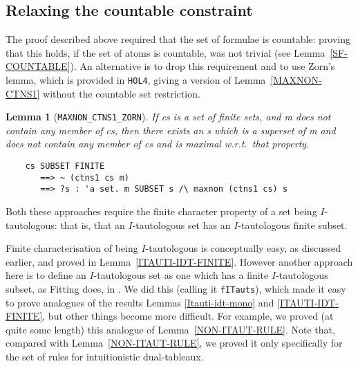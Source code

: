 \documentclass[a4paper]{article}
\newtheorem{lemma}{Lemma}
\newcommand{\hol}{\texttt{HOL4}}
\begin{document}
\subsection{Relaxing the countable constraint}

The proof described above required that the set of formulae is
countable: proving that this holds, if the set of atoms is countable,
was not trivial (see Lemma~\ref{SF-COUNTABLE}).
An alternative is to drop this requirement and to use Zorn's lemma, which is
provided in \hol, giving a version of Lemma~\ref{MAXNON-CTNS1}
without the countable set restriction.

\begin{lemma}[\texttt{MAXNON\_CTNS1\_ZORN}] \label{MAXNON-CTNS1-ZORN}
  If cs is a set of finite sets, and m does not contain any member of cs,
  then there exists an s which is a  superset of m 
  and does not contain any
  member of cs and is maximal w.r.t.\ that property.
\begin{verbatim}
    cs SUBSET FINITE 
       ==> ~ (ctns1 cs m) 
       ==> ?s : 'a set. m SUBSET s /\ maxnon (ctns1 cs) s
\end{verbatim}
\end{lemma}

Both these approaches require the finite character property of 
a set being $I$-tautologous: that is, that an $I$-tautologous set has
an $I$-tautologous finite subset.

Finite characterisation of being $I$-tautologous is conceptually easy,
as discussed earlier, and proved in Lemma~\ref{ITAUTI-IDT-FINITE}.
%
However another approach here is to define an $I$-tautologous set as one which
has a finite $I$-tautologous subset, as Fitting does, in
\cite[Definition~7]{fitting-dual-tableau}. 
We did this (calling it \texttt{fITauts}), which made it easy to
prove analogues of the results
Lemmas \ref{Itauti-idt-mono} and \ref{ITAUTI-IDT-FINITE}, but other
things become more difficult.  For example, we proved (at quite some
length) this analogue of %
Lemma~\ref{NON-ITAUT-RULE}.
Note that, compared with Lemma~\ref{NON-ITAUT-RULE},
we proved it only specifically for the set of rules
for intuitionistic dual-tableaux.
\end{document}
